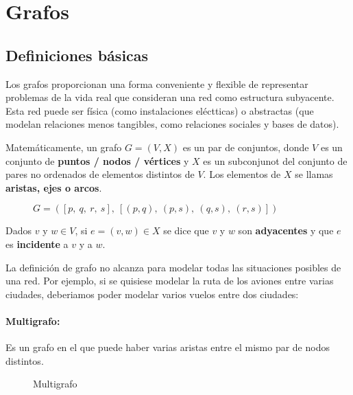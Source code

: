 \section{Grafos}
\subsection{Definiciones básicas}
Los grafos proporcionan una forma conveniente y flexible de representar problemas de la vida real que consideran una red como estructura subyacente. Esta red puede ser física (como instalaciones eléctticas) o abstractas (que modelan relaciones menos tangibles, como relaciones sociales y bases de datos).

Matemáticamente, un grafo \(G = (V,X)\) es un par de conjuntos, donde \(V\) es un conjunto de \textbf{puntos / nodos / vértices} y \(X\) es un subconjunot del conjunto de pares no ordenados de elementos distintos de \(V\). Los elementos de \(X\) se llamas \textbf{aristas, ejes o arcos}.

\begin{figure}[H]
	\begin{center}

	\end{center}
	\caption{\(G =([p,~q,~r,~s],~[(p,q),~(p,s),~(q,s),~(r,s)])\)
	}
\end{figure}

Dados \(v\) y \(w \in V\), si \(e=(v,w)\in X\) se dice que \(v\) y \(w\) son \textbf{adyacentes} y que \(e\) es \textbf{incidente} a \(v\) y a \(w\).

La definición de grafo no alcanza para modelar todas las situaciones posibles de una red. Por ejemplo, si se quisiese modelar la ruta de los aviones entre varias ciudades, deberiamos poder modelar varios vuelos entre dos ciudades:

\paragraph{Multigrafo:} Es un grafo en el que puede haber varias aristas entre el mismo par de nodos distintos.
\begin{figure}[H]
	\begin{center}
	\end{center}
	\caption{Multigrafo}
\end{figure}
